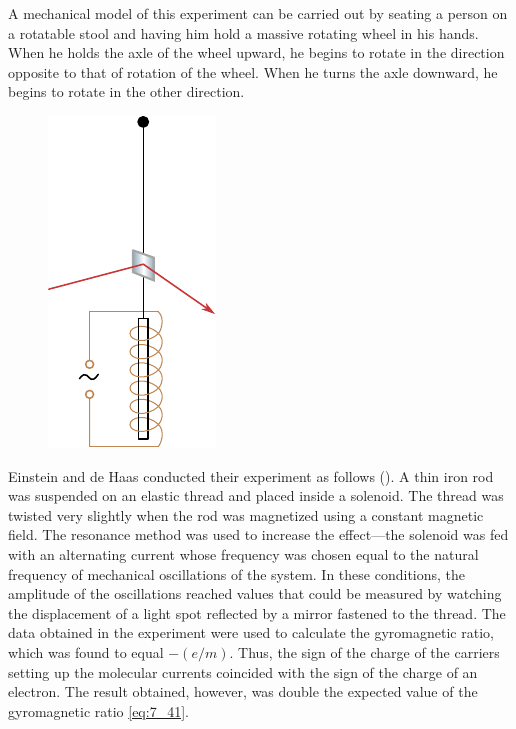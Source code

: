 A mechanical model of this experiment can be carried out by seating a person on a rotatable stool and having him hold a massive rotating wheel in his hands.
When he holds the axle of the wheel upward, he begins to rotate in the direction opposite to that of rotation of the wheel.
When he turns the axle downward, he begins to rotate in the other direction.

\begin{figure}[!htb]
	\begin{center}
		\includegraphics[scale=1]{figures/ch_07/fig_7_11.pdf}
		\caption[]{}
		\label{fig:7_11}
	\end{center}
	\vspace{-0.8cm}
\end{figure}

Einstein and de Haas conducted their experiment as follows ().
A thin iron rod was suspended on an elastic thread and placed inside a solenoid.
The thread was twisted very slightly when the rod was magnetized using a constant magnetic field.
The resonance method was used to increase the effect---the solenoid was fed with an alternating current whose frequency was chosen equal to the natural frequency of mechanical oscillations of the system.
In these conditions, the amplitude of the oscillations reached values that could be measured by watching the displacement of a light spot reflected by a mirror fastened to the thread.
The data obtained in the experiment were used to calculate the gyromagnetic ratio, which was found to equal $-(e/m)$.
Thus, the sign of the charge of the carriers setting up the molecular currents coincided with the sign of the charge of an electron.
The result obtained, however, was double the expected value of the gyromagnetic ratio \eqref{eq:7_41}.

